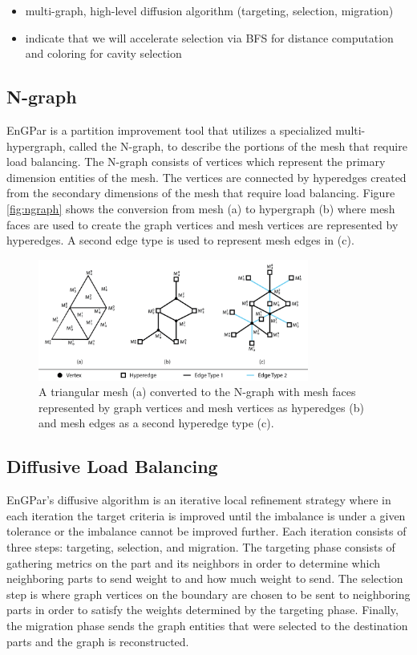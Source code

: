 \documentclass[graybox]{svmult}
\begin{document}
\begin{itemize}
  \item multi-graph, high-level diffusion algorithm (targeting, selection, migration)
  \item indicate that we will accelerate selection via BFS for distance computation and coloring for cavity selection
\end{itemize}

\subsection{N-graph}

EnGPar is a partition improvement tool that utilizes a specialized multi-hypergraph,
called the N-graph, to describe the portions of the mesh that require load balancing.
The N-graph consists of vertices which represent the primary dimension entities of the
mesh. The vertices are connected by hyperedges created from the secondary dimensions of
the mesh that require load balancing. Figure \ref{fig:ngraph} shows the conversion from
mesh (a) to hypergraph (b) where mesh faces are used to create the graph vertices and
mesh vertices are represented by hyperedges. A second edge type is used to represent mesh edges in (c). 

\begin{figure}[!ht]
  \centering
  \includegraphics[width=3.5in]{images/exampleMesh2Graph.png}
  \caption{A triangular mesh (a) converted to the N-graph with mesh faces represented by graph vertices and mesh vertices as hyperedges (b) and mesh edges as a second hyperedge type (c).}
  \label{fig:edgecounts}
\end{figure}


\subsection{Diffusive Load Balancing}

EnGPar's diffusive algorithm is an iterative local refinement strategy where in each
iteration the target criteria is improved until the imbalance is under a given
tolerance or the imbalance cannot be improved further. Each iteration consists of three
steps: targeting, selection, and migration. The targeting phase consists of gathering
metrics on the part and its neighbors in order to determine which neighboring parts to
send weight to and how much weight to send. The selection step is where graph vertices
on the boundary are chosen to be sent to neighboring parts in order to satisfy the
weights determined by the targeting phase. Finally, the migration phase sends the graph
entities that were selected to the destination parts and the graph is reconstructed.
\end{document}
